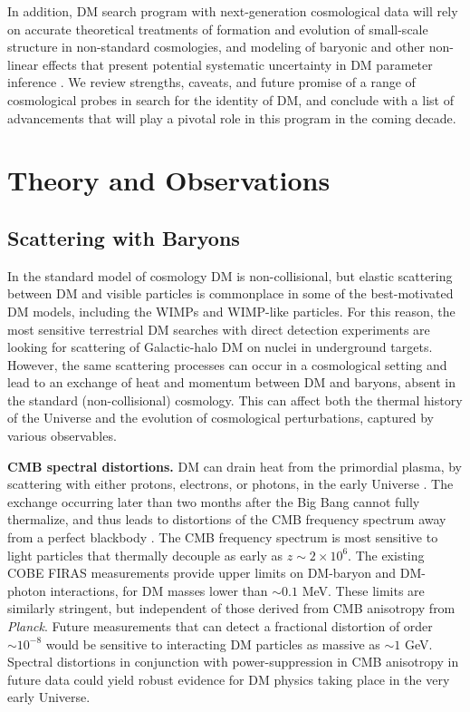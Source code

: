 \documentclass[12pt]{article}
\begin{document}
In addition, DM search program with next-generation cosmological data will rely on accurate theoretical treatments of formation and evolution of small-scale structure in non-standard cosmologies, and modeling of baryonic and other non-linear effects that present potential systematic uncertainty in DM parameter inference \cite{2019arXiv190201055D,2018PhRvD..98h3540M,2019PhRvD..99b3523A}.
We review strengths, caveats, and future promise of a range of cosmological probes in search for the identity of DM, and conclude with a list of advancements that will play a pivotal role in this program in the coming decade.
\vspace{-0.4cm}
\section{Theory and Observations}
\label{sec:thobs}
\vspace{-0.2cm}
\subsection{Scattering with Baryons}

In the standard model of cosmology DM is non-collisional, but elastic scattering between DM and visible particles is commonplace in some of the best-motivated DM models, including the WIMPs and WIMP-like particles.
For this reason, the most sensitive terrestrial DM searches with direct detection experiments are looking for scattering of Galactic-halo DM on nuclei in underground targets.
However, the same scattering processes can occur in a cosmological setting and lead to an exchange of heat and momentum between DM and baryons, absent in the standard (non-collisional) cosmology. 
This can affect both the thermal history of the Universe and the evolution of cosmological perturbations, captured by various observables.

\textbf{CMB spectral distortions.} 
DM can drain heat from the primordial plasma, by scattering with either protons, electrons, or photons, in the early Universe \cite{AliHaimoud_15}.
The exchange occurring later than two months after the Big Bang cannot fully thermalize, and thus leads to distortions of the CMB frequency spectrum away from a perfect blackbody \cite{Hu_96,2012MNRAS.419.1294C}.  
The CMB frequency spectrum is most sensitive to light particles that thermally decouple as early as $z \sim 2 \times 10^6$.
The existing COBE FIRAS measurements provide upper limits on DM-baryon and DM-photon interactions, for DM masses lower than $\sim 0.1$ MeV. 
These limits are similarly stringent, but independent of those derived from CMB anisotropy from \textit{Planck}.
Future measurements that can detect a fractional distortion of order $\sim 10^{-8}$ would be sensitive to interacting DM particles as massive as $\sim 1$ GeV. 
Spectral distortions in conjunction with power-suppression in CMB anisotropy in future data could yield robust evidence for DM physics taking place in the very early Universe.
\end{document}
